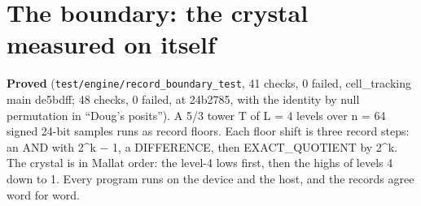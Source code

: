 \section{\texorpdfstring{The boundary: the crystal measured on itself}{The boundary: the crystal measured on itself}}

\textbf{Proved} (\texttt{test/\allowbreak{}engine/\allowbreak{}record\_\allowbreak{}boundary\_\allowbreak{}test}, 41 checks, 0 failed, cell\_\allowbreak{}tracking main de5bdff; 48 checks, 0 failed, at 24b2785, with the identity by null permutation in “Doug's posits”). A 5/3 tower T of L = 4 levels over n = 64 signed 24-bit samples runs as record floors. Each floor shift is three record steps: an AND with 2\textasciicircum{}k − 1, a DIFFERENCE, then EXACT\_\allowbreak{}QUOTIENT by 2\textasciicircum{}k. The crystal is in Mallat order: the level-4 lows first, then the highs of levels 4 down to 1. Every program runs on the device and the host, and the records agree word for word.

